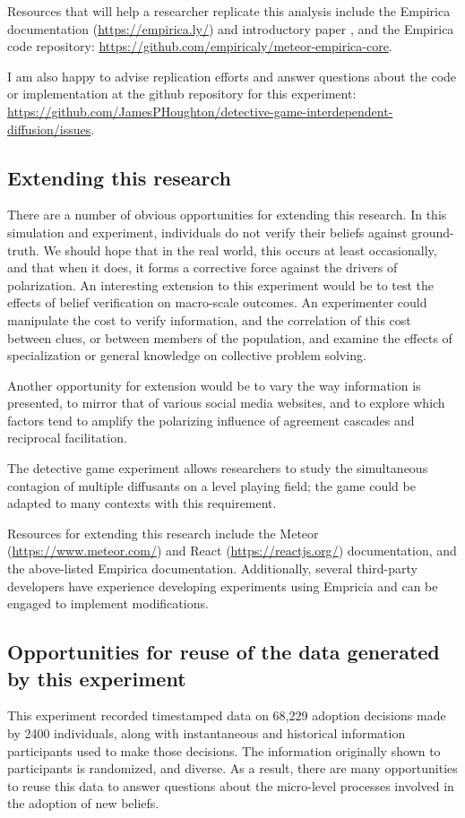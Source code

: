 \documentclass{article}
\begin{document}
Resources that will help a researcher replicate this analysis include the Empirica documentation (\url{https://empirica.ly/}) and introductory paper \cite{almaatouq2021empirica}, and the Empirica code repository: \url{https://github.com/empiricaly/meteor-empirica-core}. 

I am also happy to advise replication efforts and answer questions about the code or implementation at the github repository for this experiment: \url{https://github.com/JamesPHoughton/detective-game-interdependent-diffusion/issues}.

\subsection{Extending this research}
There are a number of obvious opportunities for extending this research. In this simulation and experiment, individuals do not verify their beliefs against ground-truth. We should hope that in the real world, this occurs at least occasionally, and that when it does, it forms a corrective force against the drivers of polarization. An interesting extension to this experiment would be to test the effects of belief verification on macro-scale outcomes. An experimenter could manipulate the cost to verify information, and the correlation of this cost between clues, or between members of the population, and examine the effects of specialization or general knowledge on collective problem solving.

Another opportunity for extension would be to vary the way information is presented, to mirror that of various social media websites, and to explore which factors tend to amplify the polarizing influence of agreement cascades and reciprocal facilitation. 

The detective game experiment allows researchers to study the simultaneous contagion of multiple diffusants on a level playing field; the game could be adapted to many contexts with this requirement.

Resources for extending this research include the Meteor (\url{https://www.meteor.com/}) and React (\url{https://reactjs.org/}) documentation, and the above-listed Empirica documentation. Additionally, several third-party developers have experience developing experiments using Empricia and can be engaged to implement modifications. 

\subsection{Opportunities for reuse of the data generated by this experiment}
This experiment recorded timestamped data on 68,229 adoption decisions made by 2400 individuals, along with instantaneous and historical information participants used to make those decisions. The information originally shown to participants is randomized, and diverse. As a result, there are many opportunities to reuse this data to answer questions about the micro-level processes involved in the adoption of new beliefs. 



\end{document}
